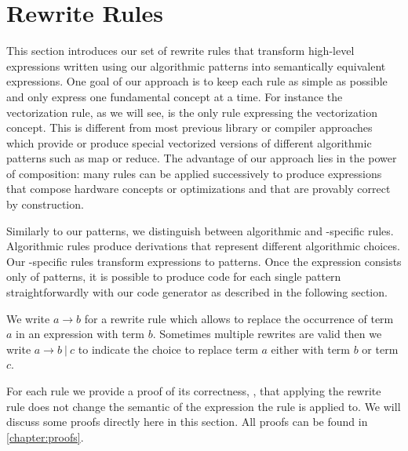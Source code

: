 \section{Rewrite Rules}
\label{section:rules}

This section introduces our set of rewrite rules that transform high-level expressions written using our algorithmic patterns into semantically equivalent expressions.
One goal of our approach is to keep each rule as simple as possible and only express one fundamental concept at a time.
For instance the vectorization rule, as we will see, is the only rule expressing the vectorization concept.
This is different from most previous library or compiler approaches which provide or produce special vectorized versions of different algorithmic patterns such as map or reduce.
The advantage of our approach lies in the power of composition:
many rules can be applied successively to produce expressions that compose hardware concepts or optimizations and that are provably correct by construction.

Similarly to our patterns, we distinguish between algorithmic and \OpenCL-specific rules.
Algorithmic rules produce derivations that represent different algorithmic choices.
Our \OpenCL-specific rules transform expressions to \OpenCL patterns.
Once the expression consists only of \OpenCL patterns, it is possible to produce \OpenCL code for each single pattern straightforwardly with our code generator as described in the following section.

We write $a \rightarrow b$ for a rewrite rule which allows to replace the occurrence of term $a$ in an expression with term $b$.
Sometimes multiple rewrites are valid then we write $a \rightarrow b\ |\ c$ to indicate the choice to replace term $a$ either with term $b$ or term $c$.

For each rule we provide a proof of its correctness, \ie, that applying the rewrite rule does not change the semantic of the expression the rule is applied to.
We will discuss some proofs directly here in this section.
All proofs can be found in \autoref{chapter:proofs}.



